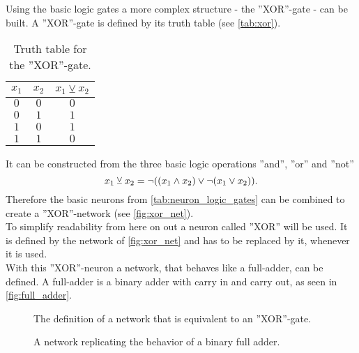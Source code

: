 \medskip
\noindent Using the basic logic gates a more complex structure - the ''XOR''-gate - can be built. A ''XOR''-gate is defined by its truth table (see \autoref{tab:xor}).
\begin{table}[H]
\centering
\begin{tabular}{c c|c}
$x_1$ & $x_2$ & $x_1\veebar x_2$\\
\hline
$0$ & $0$ & $0$\\
$0$ & $1$ & $1$\\
$1$ & $0$ & $1$\\
$1$ & $1$ & $0$
\end{tabular}
\caption[Truth table ''XOR'']{Truth table for the ''XOR''-gate.}\label{tab:xor}
\end{table}
It can be constructed from the three basic logic operations ''and'', ''or'' and ''not''
\begin{equation}
x_1\veebar x_2 = \lnot{\left( {\left( x_1\land x_2 \right)}\lor\lnot{\left( x_1\lor x_2 \right)} \right)}.
\end{equation}
Therefore the basic neurons from \autoref{tab:neuron_logic_gates} can be combined to create a ''XOR''-network (see \autoref{fig:xor_net}).\\
To simplify readability from here on out a neuron called ''XOR'' will be used. It is defined by the network of \autoref{fig:xor_net} and has to be replaced by it, whenever it is used.\\
With this ''XOR''-neuron a network, that behaves like a full-adder, can be defined. A full-adder is a binary adder with carry in and carry out, as seen in \autoref{fig:full_adder}.
\begin{figure}[H]
\centering

\caption[''XOR''-network]{The definition of a network that is equivalent to an ''XOR''-gate.}\label{fig:xor_net}
\end{figure}
\begin{figure}[H]
\centering

\caption[Full adder network]{A network replicating the behavior of a binary full adder.}\label{fig:full_adder}
\end{figure}

